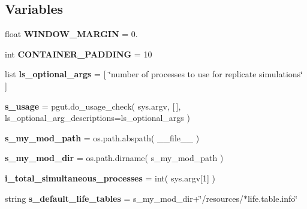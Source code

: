 \subsection*{Variables}
\begin{DoxyCompactItemize}
\item 
float {\bfseries W\+I\+N\+D\+O\+W\+\_\+\+M\+A\+R\+G\+IN} = 0.\hypertarget{namespacenegui_1_1negui_a9b4bed807593f13a45b32cad9ad03302}{}\label{namespacenegui_1_1negui_a9b4bed807593f13a45b32cad9ad03302}

\item 
int {\bfseries C\+O\+N\+T\+A\+I\+N\+E\+R\+\_\+\+P\+A\+D\+D\+I\+NG} = 10\hypertarget{namespacenegui_1_1negui_a697772153f0161816728f03911a53ed4}{}\label{namespacenegui_1_1negui_a697772153f0161816728f03911a53ed4}

\item 
list {\bfseries ls\+\_\+optional\+\_\+args} = \mbox{[} \char`\"{}number of processes to use for replicate simulations\char`\"{} \mbox{]}\hypertarget{namespacenegui_1_1negui_a0e9000340ecb28a76174866dbd51c619}{}\label{namespacenegui_1_1negui_a0e9000340ecb28a76174866dbd51c619}

\item 
{\bfseries s\+\_\+usage} = pgut.\+do\+\_\+usage\+\_\+check( sys.\+argv, \mbox{[}$\,$\mbox{]}, ls\+\_\+optional\+\_\+arg\+\_\+descriptions=ls\+\_\+optional\+\_\+args )\hypertarget{namespacenegui_1_1negui_a3655412177f9ff140033a529e87bcf06}{}\label{namespacenegui_1_1negui_a3655412177f9ff140033a529e87bcf06}

\item 
{\bfseries s\+\_\+my\+\_\+mod\+\_\+path} = os.\+path.\+abspath( \+\_\+\+\_\+file\+\_\+\+\_\+ )\hypertarget{namespacenegui_1_1negui_ac3d503277c8f4b646ff8bc4a88922931}{}\label{namespacenegui_1_1negui_ac3d503277c8f4b646ff8bc4a88922931}

\item 
{\bfseries s\+\_\+my\+\_\+mod\+\_\+dir} = os.\+path.\+dirname( s\+\_\+my\+\_\+mod\+\_\+path )\hypertarget{namespacenegui_1_1negui_af56cb9927731f0b94f9bf9744ae41e4f}{}\label{namespacenegui_1_1negui_af56cb9927731f0b94f9bf9744ae41e4f}

\item 
{\bfseries i\+\_\+total\+\_\+simultaneous\+\_\+processes} = int( sys.\+argv\mbox{[}1\mbox{]} )\hypertarget{namespacenegui_1_1negui_ab356fd36c69789db2b3bc1a0793d937d}{}\label{namespacenegui_1_1negui_ab356fd36c69789db2b3bc1a0793d937d}

\item 
string {\bfseries s\+\_\+default\+\_\+life\+\_\+tables} = s\+\_\+my\+\_\+mod\+\_\+dir+\char`\"{}/resources/$\ast$life.\+table.\+info\char`\"{}\hypertarget{namespacenegui_1_1negui_aebe3cdf18a6fb06977342427f5bdf539}{}\label{namespacenegui_1_1negui_aebe3cdf18a6fb06977342427f5bdf539}


\end{DoxyCompactItemize}
